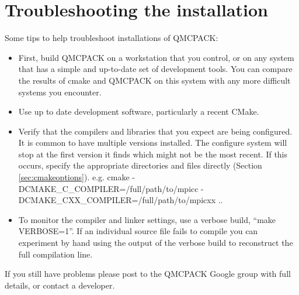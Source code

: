 \section{Troubleshooting the installation}
\label{sec:troubleshoot}
Some tips to help troubleshoot installations of QMCPACK:
\begin{itemize}
\item First, build QMCPACK on a workstation that you control, or on any
  system that has a simple and up-to-date set of development
  tools. You can compare the results of cmake and QMCPACK on this
  system with any more difficult systems you encounter.
\item Use up to date development software, particularly a recent
  CMake. 
\item Verify that the compilers and libraries that you expect are
  being configured. It is common to have multiple versions
  installed. The configure system will stop at the first version it
  finds which might not be the most recent. If this occurs, specify the appropriate
  directories and files directly (Section
  \ref{sec:cmakeoptions}). e.g. cmake -DCMAKE\_C\_COMPILER=/full/path/to/mpicc -DCMAKE\_CXX\_COMPILER=/full/path/to/mpicxx ..
\item To monitor the compiler and linker settings, use a verbose build, ``make
  VERBOSE=1''. If an individual source file fails to compile you
  can experiment by hand using the output of the verbose build to
  reconstruct the full compilation line.
\end{itemize}

If you still have problems please post to the QMCPACK Google group with full
details, or contact a developer.
